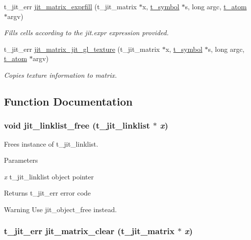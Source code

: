 \begin{DoxyCompactItemize}
t\_\-jit\_\-err \hyperlink{group__matrixmod_ga85d4a4256d423c720489526a56803396}{jit\_\-matrix\_\-exprfill} (t\_\-jit\_\-matrix $\ast$x, \hyperlink{structt__symbol}{t\_\-symbol} $\ast$s, long argc, \hyperlink{structt__atom}{t\_\-atom} $\ast$argv)
\begin{DoxyCompactList}\small\item\em Fills cells according to the jit.expr expression provided. \item\end{DoxyCompactList}\item 
t\_\-jit\_\-err \hyperlink{group__matrixmod_gae640384806be8bb78a2cb0118c629a0f}{jit\_\-matrix\_\-jit\_\-gl\_\-texture} (t\_\-jit\_\-matrix $\ast$x, \hyperlink{structt__symbol}{t\_\-symbol} $\ast$s, long argc, \hyperlink{structt__atom}{t\_\-atom} $\ast$argv)
\begin{DoxyCompactList}\small\item\em Copies texture information to matrix. \item\end{DoxyCompactList}\end{DoxyCompactItemize}


\subsection{Function Documentation}
\hypertarget{group__matrixmod_ga42ada5c64ab9ba19ba4e58461dd1a823}{
\subsubsection[{jit\_\-linklist\_\-free}]{\setlength{\rightskip}{0pt plus 5cm}void jit\_\-linklist\_\-free (t\_\-jit\_\-linklist $\ast$ {\em x})}}
\label{group__matrixmod_ga42ada5c64ab9ba19ba4e58461dd1a823}


Frees instance of t\_\-jit\_\-linklist. 
\begin{DoxyParams}{Parameters}
\item[{\em x}]t\_\-jit\_\-linklist object pointer\end{DoxyParams}
\begin{DoxyReturn}{Returns}
t\_\-jit\_\-err error code
\end{DoxyReturn}
\begin{DoxyWarning}{Warning}
Use jit\_\-object\_\-free instead. 
\end{DoxyWarning}
\hypertarget{group__matrixmod_ga7dd2097e966c5365486652b6d9e32565}{
\subsubsection[{jit\_\-matrix\_\-clear}]{\setlength{\rightskip}{0pt plus 5cm}t\_\-jit\_\-err jit\_\-matrix\_\-clear (t\_\-jit\_\-matrix $\ast$ {\em x})}}
\label{group__matrixmod_ga7dd2097e966c5365486652b6d9e32565}


